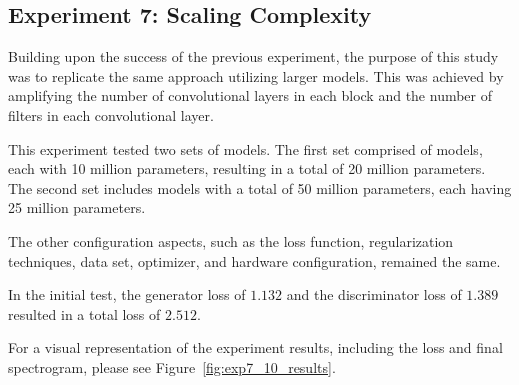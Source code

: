 \subsection{Experiment 7: Scaling Complexity} \label{sec:exp7}

Building upon the success of the previous experiment, the purpose of this study was to replicate the same approach utilizing larger models. This was achieved by amplifying the number of convolutional layers in each block and the number of filters in each convolutional layer.

This experiment tested two sets of models. The first set comprised of models, each with 10 million parameters, resulting in a total of 20 million parameters. The second set includes models with a total of 50 million parameters, each having 25 million parameters.

The other configuration aspects, such as the loss function, regularization techniques, data set, optimizer, and hardware configuration, remained the same.

In the initial test, the generator loss of $1.132$ and the discriminator loss of $1.389$ resulted in a total loss of $2.512$.

For a visual representation of the experiment results, including the loss and final spectrogram, please see Figure~\ref{fig:exp7_10_results}.

